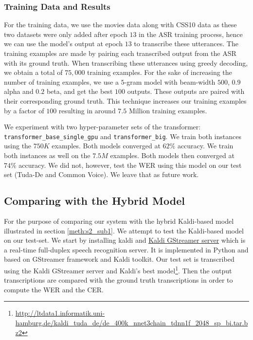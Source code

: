\subsubsection{Training Data and Results}
\label{meth:s4_sub7_subsub2}

For the training data, we use the movies data along with CSS10 data as these two datasets were only added after epoch $13$ in the \ac{ASR} training process, hence we can use the model's output at epoch $13$ to transcribe these utterances. The training examples are made by pairing each transcribed output from the \ac{ASR} with its ground truth. When transcribing these utterances using greedy decoding, we obtain a total of $75,000$ training examples. For the sake of increasing the number of training examples, we use a $5$-gram model with beam-width $500$, $0.9$ alpha and $0.2$ beta, and get the best $100$ outputs. These outputs are paired with their corresponding ground truth. This technique increases our training examples by a factor of $100$ resulting in around $7.5$ Million training examples. 


We experiment with two hyper-parameter sets of the transformer: \texttt{transformer\_base\_single\_gpu} and \texttt{transformer\_big}. We train both instances using the $750K$ examples. Both models converged at $62\%$ accuracy.
We train both instances as well on the $7.5M$ examples. 
Both models then converged at  $74\%$ accuracy. We did not, however, test the \ac{WER} using this model on our test set (Tuda-De and Common Voice). We leave that as future work. 



\subsection{Comparing with the Hybrid Model}
\label{meth:s4_sub8}

For the purpose of comparing our system with the hybrid Kaldi-based model \cite{milde2018open} illustrated in section \ref{meth:s2_sub1}. We attempt to test the Kaldi-based model on our test-set. We start by installing kaldi and \href{https://github.com/alumae/kaldi-gstreamer-server}{Kaldi GStreamer server} which is a real-time full-duplex speech recognition server. It is implemented in Python and based on GStreamer framework and Kaldi toolkit. Our test set is transcribed using the Kaldi GStreamer server and Kaldi's best model\footnote{\url{http://ltdata1.informatik.uni-hamburg.de/kaldi_tuda_de/de_400k_nnet3chain_tdnn1f_2048_sp_bi.tar.bz2}}. Then the output transcriptions are compared with the ground truth transcriptions in order to compute the \ac{WER} and the \ac{CER}. 


